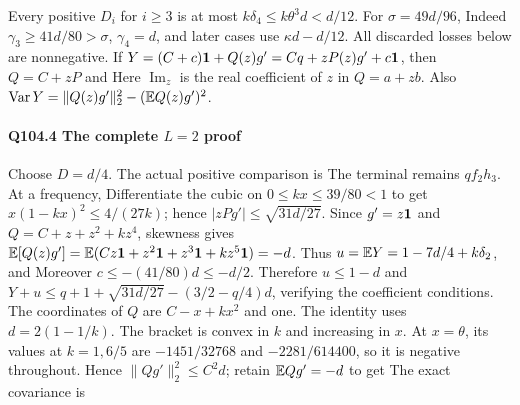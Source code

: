 Every positive $D_i$ for $i\ge\allowbreak 3$ is at most
$k\delta_4\le\allowbreak  k\theta^3d<\allowbreak d/12$.
For $\sigma=\allowbreak 49d/96$,
Indeed $\gamma_3\ge\allowbreak 41d/80>\allowbreak \sigma$, $\gamma_4=\allowbreak d$, and later cases
use $\kappa d-d/12$. All discarded losses below are nonnegative.
If $Y=\allowbreak (C+c)\mathbf1+Q(z)g'=\allowbreak Cq+zP(z)g'+c\mathbf1$, then $Q=\allowbreak C+zP$ and
Here $\operatorname{Im}_z$ is the real coefficient of $z$ in $Q=\allowbreak a+zb$.
Also $\operatorname{Var}Y=\allowbreak \|Q(z)g'\|_2^2-(\mathbb E Q(z)g')^2$.

\paragraph{Q104.4 The complete $L=\allowbreak 2$ proof}\label{part:Q104.4}
Choose $D=\allowbreak d/4$. The actual positive comparison is
The terminal remains $qf_2h_3$. At a frequency,
Differentiate the cubic on $0\le\allowbreak  kx\le\allowbreak 39/80<\allowbreak 1$ to get
$x(1-kx)^2\le\allowbreak 4/(27k)$; hence $|zPg'|\le\allowbreak \sqrt{31d/27}$.
Since $g'=\allowbreak z\mathbf1$ and $Q=\allowbreak C+z+z^2+kz^4$, skewness gives
$\mathbb E[Q(z)g']=\allowbreak \mathbb E(Cz\mathbf1+z^2\mathbf1+z^3\mathbf1+kz^5\mathbf1)=\allowbreak -d$.
Thus $u=\allowbreak \mathbb E Y=\allowbreak 1-7d/4+k\delta_2$, and
Moreover $c\le\allowbreak -(41/80)d\le\allowbreak -d/2$.
Therefore $u\le\allowbreak 1-d$ and
$Y+u\le\allowbreak  q+1+\sqrt{31d/27}-(3/2-q/4)d$, verifying the coefficient conditions.
The coordinates of $Q$ are $C-x+kx^2$ and one. The identity
uses $d=\allowbreak 2(1-1/k)$. The bracket is convex in $k$ and increasing in $x$.
At $x=\allowbreak \theta$, its values at $k=\allowbreak 1,\allowbreak 6/5$ are
$-1451/32768$ and $-2281/614400$, so it is negative throughout.
Hence $\|Qg'\|_2^2\le\allowbreak  C^2d$; retain $\mathbb E Qg'=\allowbreak -d$ to get
The exact covariance is
